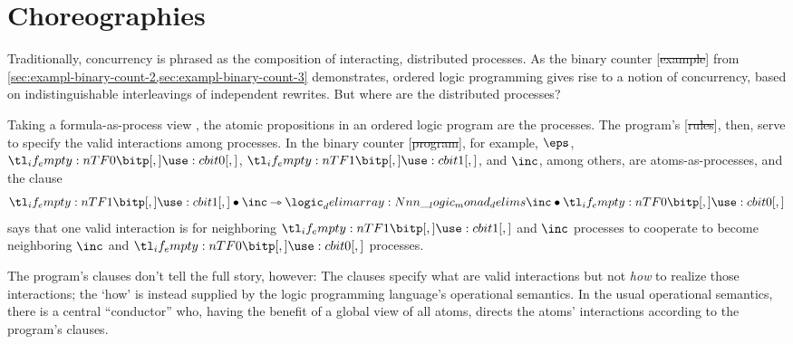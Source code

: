 \section{Choreographies}\label{sec:choreographies}

Traditionally, concurrency is phrased as the composition of interacting, distributed processes.
As the binary counter [\st{example}] from \cref{sec:exampl-binary-count-2,sec:exampl-binary-count-3} demonstrates, ordered logic programming gives rise to a notion of concurrency, based on indistinguishable interleavings of independent rewrites.
But where are the distributed processes?

Taking a formula-as-process view \autocites{Miller:ELP92}{Cervesato+Scedrov:IC09}, the atomic propositions in an ordered logic program are the processes.
The program's [\st{rules}], then, serve to specify the valid interactions among processes. 
In the binary counter [\st{program}], for example, $\eps$, $\bit{0}$, $\bit{1}$, and $\inc$, among others,
are
atoms-as-processes,
and the clause
\begin{equation*}
  \bit{1} \fuse \inc \lrimp \monad{\inc \fuse \bit{0}}
\end{equation*}
says that one valid interaction is for neighboring $\bit{1}$ and $\inc$ processes to cooperate to become neighboring $\inc$ and $\bit{0}$ processes.

The program's clauses don't tell the full story, however:
The clauses specify what are valid interactions but not \emph{how} to realize those interactions; the \enquote*{how} is instead supplied by the logic programming language's operational semantics.
In the usual operational semantics, there is a central \enquote{conductor} who, having the benefit of a global view of all atoms, directs the atoms' interactions according to the program's clauses.

